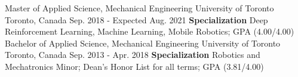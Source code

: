 \begin{cventries}
  \cventry
    {Master of Applied Science, Mechanical Engineering}
    {University of Toronto}
    {Toronto, Canada}
    {Sep. 2018 - Expected Aug. 2021}
    {\textbf{Specialization} Deep Reinforcement Learning, Machine Learning, Mobile Robotics; GPA (4.00/4.00)}
  \cventry
    {Bachelor of Applied Science, Mechanical Engineering}
    {University of Toronto}
    {Toronto, Canada}
    {Sep. 2013 - Apr. 2018}
    {\textbf{Specialization} Robotics and Mechatronics Minor; Dean's Honor List for all terms; GPA (3.81/4.00)}
\end{cventries}
